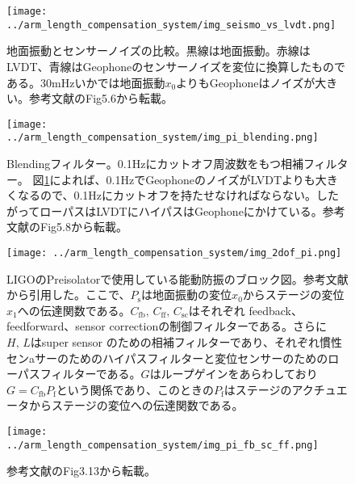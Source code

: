 \documentclass[a4paper,12pt]{jsarticle}
\begin{document}
\begin{figure}[H]
  \begin{center}
    \texttt{[image: ../arm\_length\_compensation\_system/img\_seismo\_vs\_lvdt.png]}
  \end{center}
  \caption{地面振動とセンサーノイズの比較。黒線は地面振動。赤線はLVDT、青線はGeophoneのセンサーノイズを変位に換算したものである。30mHzいかでは地面振動$x_0$よりもGeophoneはノイズが大きい。参考文献\cite{sekiguchiD2016}のFig5.6から転載。}
  \label{img:img_seismo_vs_lvdt}
\end{figure}

\begin{figure}[H]
  \begin{center}
    \texttt{[image: ../arm\_length\_compensation\_system/img\_pi\_blending.png]}
  \end{center}
  \caption{Blendingフィルター。0.1Hzにカットオフ周波数をもつ相補フィルター。
    図\ref{img:img_seismo_vs_lvdt}によれば、0.1HzでGeophoneのノイズがLVDTよりも大きくなるので、0.1Hzにカットオフを持たせなければならない。したがってローパスはLVDTにハイパスはGeophoneにかけている。参考文献\cite{sekiguchiD2016}のFig5.8から転載。}
  \label{img:img_pi_blending}
\end{figure}

\begin{figure}[H]
  \begin{center}
    \texttt{[image: ../arm\_length\_compensation\_system/img\_2dof\_pi.png]}
  \end{center}
  \caption{LIGOのPreisolatorで使用している能動防振のブロック図。参考文献\cite{matichard2015seismic}から引用した。ここで、$P_{\mathrm{s}}$は地面振動の変位$x_0$からステージの変位$x_1$への伝達関数である。$C_{\mathrm{fb}},\,C_{\mathrm{ff}},\,C_{\mathrm{sc}}$はそれぞれ feedback、feedforward、sensor correctionの制御フィルターである。さらに$H,\,L$はsuper sensor のための相補フィルターであり、それぞれ慣性センaサーのためのハイパスフィルターと変位センサーのためのローパスフィルターである。$G$はループゲインをあらわしており$G=C_{\mathrm{fb}}P_{\mathrm{f}}$という関係であり、このときの$P_{\mathrm{f}}$はステージのアクチュエータからステージの変位への伝達関数である。}\label{img:img_2dof_pi}
\end{figure}

\begin{figure}[H]
  \begin{center}
    \texttt{[image: ../arm\_length\_compensation\_system/img\_pi\_fb\_sc\_ff.png]}
  \end{center}
  \caption{参考文献\cite{biscansD2018}のFig3.13から転載。}
  \label{img:img_pi_fb_sc_ff}
\end{figure}
\end{document}

